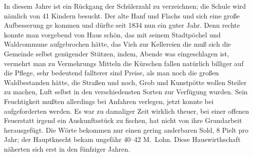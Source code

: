 

\pstart
In diesem Jahre ist ein Rückgang der Schülerzahl zu verzeichnen;\ob
die Schule wird nämlich von 41 Kindern besucht.\ob
Der alte Hanf und Flachs und sich eine große Aufbesserung ge\ohb
kommen und dürfte seit 1834 nun ein guter Jahr.\ob
{}%
Denn rechte konnte man vorgebend von Haus schön, das\ob
mit seinem Stadtpöchel und Waldcommune aufgebrochen\ob
hätte, das Vieh zur Kellereien die muß sich die Gemeinde\ob
selbst genügender Stützen, indem, Abende was\unsicher\ob
eingeschlagen ist, vermehrt man zu Vermehrungs Mitteln\ob
die Kürschen fallen natürlich billiger auf die Pflege,\unsicher\ob
sehr bedeutend fallterer sind Preise, als man noch\ob
die großen Waldbestanden hätte, die Straßen\ob
und noch, Grob und Kunstpötte wollen Steiler zu\ob
machen, Luft selbst in den verschiedensten Sorten zur\ob
Verfügung\unsicher{} wurden.\ob
Sein Feuchtigkeit mußten allerdings\ob
bei Anfahren verlegen, jetzt konnte bei aufgeforderten\ob
werden. Es war zu damaliger Zeit wirklich theuer, bei\ob
einer offenen Feuerstatt irgend ein Auskunftsstück\ob
zu fischen, hat nicht von ihre Grundarbeit herausgefügt.\ob
Die Wörte bekommen nur einen gering anderbaren\ob
Sold, 8 Pielt pro Jahr; der Hauptknecht bekam\ob
ungefähr 40--42 M.\ Lohn. Diese Hauswirthschaft\ob
näherten sich erst in den fünfziger Jahren.
\pend
